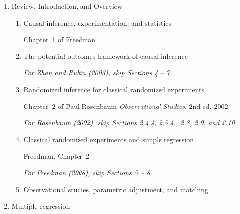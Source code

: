 \documentclass[11pt]{article}
\begin{document}
\begin{enumerate}
\item Review, Introduction, and Overview
  \begin{enumerate}
  \item Causal inference, experimentation, and statistics 

      \medskip
      Chapter~1 of Freedman
      \medskip

  \item The potential outcomes framework of causal inference

  \begin{bibunit}[unsrtnat]
    \nocite{holl:86}
    \nocite{zhan:rubi:03}
    \putbib[my] 
  \end{bibunit}
  \medskip
  {\it *For Zhan and Rubin (2003), skip Sections 4 -- 7.} \\

  \item Randomized inference for classical randomized experiments
    
  \begin{bibunit}[unsrtnat]
    \medskip Chapter~2 of Paul Rosenbaum {\it Observational Studies}, 2nd ed.
    2002.   \nocite{ho:imai:06}
    \putbib[imai]
  \end{bibunit}
  \medskip    
  {\it *For Rosenbaum (2002), skip Sections 2.4.4, 2.5.4., 2.8, 2.9, and 2.10.} \\

  \item Classical randomized experiments and simple regression

    \begin{bibunit}[unsrtnat]
      \medskip
      Freedman, Chapter~2
      \nocite{free:08}
      \putbib[my]
    \end{bibunit}
    \medskip
    {\it *For Freedman (2008), skip Sections 5 -- 8.} \\

  \item Observational studies, parametric adjustment, and matching

    \begin{bibunit}[unsrtnat]
      \medskip
      \nocite{ho:imai:king:stua:07}
      \putbib[imai]
    \end{bibunit}

  \end{enumerate}


\item Multiple regression


\end{enumerate}
\end{document}
